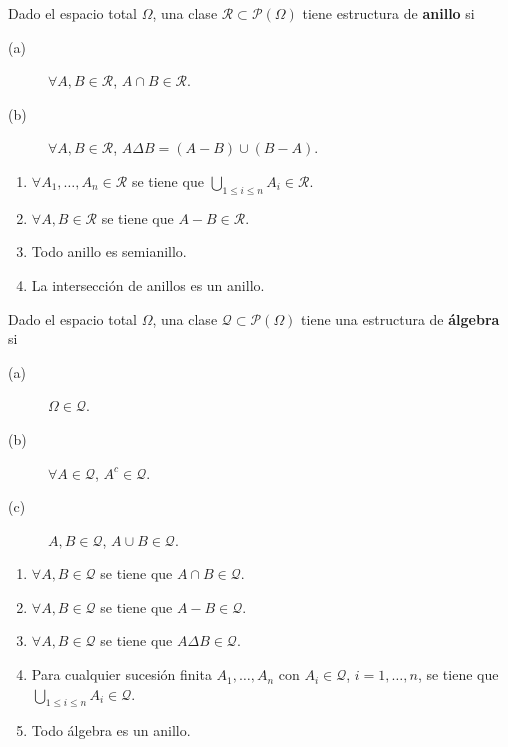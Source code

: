 \begin{definition}[Anillo]
Dado el espacio total $\displaystyle \Omega  $, una clase $\displaystyle \mathcal{R} \subset \mathcal{P}\left(\Omega \right) $ tiene estructura de \textbf{anillo} si 
\begin{description}
\item[(a)] $\displaystyle \forall A,B \in \mathcal{R} $, $\displaystyle A \cap B \in \mathcal{R} $.
\item[(b)] $\displaystyle \forall A, B \in \mathcal{R} $, $\displaystyle A \Delta B = \left(A - B\right) \cup \left(B - A\right)$.
\end{description}
\end{definition}
\begin{prop}
\begin{enumerate}
\item $\displaystyle \forall A_{1}, \ldots, A_{n} \in \mathcal{R} $ se tiene que $\displaystyle \bigcup_{1 \leq i \leq n}A_{i} \in \mathcal{R} $.
\item $\displaystyle \forall A,B \in \mathcal{R} $ se tiene que $\displaystyle A - B \in \mathcal{R} $.
\item Todo anillo es semianillo. 
\item La intersección de anillos es un anillo.
\end{enumerate}
\end{prop}
\begin{definition}[Álgebra]
Dado el espacio total $\displaystyle \Omega  $, una clase $\displaystyle \mathcal{Q}\subset \mathcal{P}\left(\Omega \right) $ tiene una estructura de \textbf{álgebra} si
\begin{description}
\item[(a)] $\displaystyle \Omega \in \mathcal{Q} $.
\item[(b)] $\displaystyle \forall A \in \mathcal{Q} $, $\displaystyle A^{c} \in \mathcal{Q} $.
\item[(c)] $\displaystyle A,B \in \mathcal{Q} $, $\displaystyle A \cup B \in \mathcal{Q} $.
\end{description}
\end{definition}
\begin{prop}
\begin{enumerate}
\item $\displaystyle \forall A,B \in \mathcal{Q} $ se tiene que $\displaystyle A \cap B \in \mathcal{Q} $.
\item $\displaystyle \forall A, B \in \mathcal{Q} $ se tiene que $\displaystyle A - B \in \mathcal{Q} $.
\item $\displaystyle \forall A, B \in \mathcal{Q} $ se tiene que $\displaystyle A \Delta B \in \mathcal{Q} $.
\item Para cualquier sucesión finita $\displaystyle A_{1}, \ldots, A_{n} $ con $\displaystyle A_{i} \in \mathcal{Q} $, $\displaystyle i = 1, \ldots, n $, se tiene que $\displaystyle \bigcup_{1 \leq i\leq n}A_{i} \in \mathcal{Q} $.
\item Todo álgebra es un anillo.
\end{enumerate}
\end{prop}
